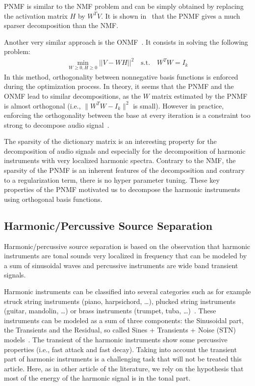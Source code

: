 PNMF is similar to the NMF problem and can be simply obtained by replacing the activation matrix $H$ by $W^TV$. It is shown in~\cite{YangOja10} that the PNMF gives a much sparser decomposition than the NMF.

Another very similar approach is the ONMF~\cite{choi}. It consists in solving the following problem: 
\begin{align}
\min_{W \geqslant 0, H \geqslant0} ||V - WH||^2 \quad   \text{s.t}.\quad W^{T}W=I_{k} 
\end{align}%
In this method, orthogonality between nonnegative basis functions is enforced during the optimization process. In theory, it seems that the PNMF and the ONMF lead to similar decompositions, as the $W$ matrix estimated by the PNMF is almost orthogonal (i.e., $\|W^{T}W-I_{k}\|^{2}$ is small). However in practice, enforcing the orthogonality between the base at every iteration is a constraint too strong to decompose audio signal~\cite{laroche2015structured}. 

The sparsity of the dictionary matrix is an interesting property for the decomposition of audio signals and especially for the decomposition of harmonic instruments with very localized harmonic spectra. Contrary to the NMF, the sparsity of the PNMF is an inherent features of the decomposition and contrary to a regularization term, there is no hyper parameter tuning. These key properties of the PNMF motivated us to decompose the harmonic instruments using orthogonal basis functions.




\subsection{Harmonic/Percussive Source Separation}

Harmonic/percussive source separation is based on the observation that harmonic instruments are tonal sounds very localized in frequency that can be modeled by a sum of sinusoidal waves and percussive instruments are wide band transient signals.

Harmonic instruments can be classified into several categories such as for example struck string instruments (piano, harpsichord, \ldots), plucked string instruments (guitar, mandolin, \ldots) or brass instruments (trumpet, tuba, \ldots)~\cite{peeters2003automatic}. These instruments can be modeled as a sum of three components: the Sinusoidal part, the Transients and the Residual, so called  Sines + Transients + Noise (STN) models~\cite{daudet2006review}. The transient of the harmonic instruments show some percussive properties (i.e., fast attack and fast decay). Taking into account the transient part of harmonic instruments is a challenging task that will not be treated this article. Here, as in other article of the literature, we rely on the hypothesis that most of the energy of the harmonic signal is in the tonal part. 


